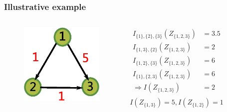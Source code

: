 \documentclass{beamer}
\begin{document}
\begin{frame}
\frametitle{Illustrative example}
\begin{columns}
\column{5cm}
\begin{figure}
\includegraphics[width=4cm]{pic/example_directed.eps}
\end{figure}
\column{5cm}
\begin{align*}
I_{\{1\},\{2\},\{3\}}(Z_{\{1,2,3\}}) & = 3.5 \\
I_{\{1,3\},\{2\}}(Z_{\{1,2,3\}}) & = 2 \\ 
I_{\{1,2\},\{3\}}(Z_{\{1,2,3\}}) & = 6 \\ 
I_{\{1\},\{2,3\}}(Z_{\{1,2,3\}}) & = 6 \\ 
\Rightarrow I(Z_{\{1,2,3\}}) & = 2 \\
\end{align*}
\begin{equation*}
I(Z_{\{1,3\}}) = 5, I(Z_{\{1,2\}}) = 1
\end{equation*}
\end{columns}
\end{frame}
\end{document}
